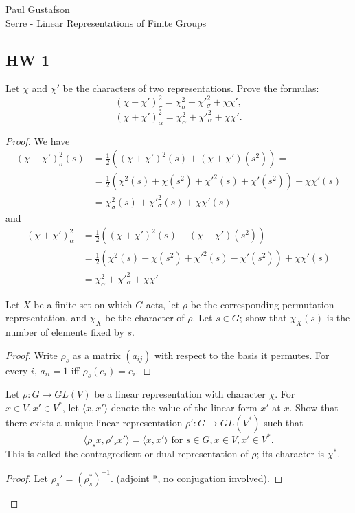 \documentclass{article}
\begin{document}
\noindent Paul Gustafson\\
\noindent Serre - Linear Representations of Finite Groups

\subsection*{HW 1}
 Let $\chi$ and $\chi'$ be the characters of two representations. Prove the formulas:
$$(\chi + \chi')_\sigma^2 = \chi_\sigma^2 + \chi'_\sigma^2 + \chi \chi',$$
$$(\chi + \chi')_\alpha^2 = \chi_\alpha^2 + \chi'_\alpha^2 + \chi \chi'.$$
\begin{proof}
We have 
\begin{align*}
(\chi + \chi')_\sigma^2(s) & = \frac 1 2 ((\chi + \chi')^2(s) + (\chi+ \chi')(s^2))= 
\\ & = \frac 1 2 (\chi^2(s) + \chi(s^2) + \chi'^2(s) + \chi'(s^2)) + \chi\chi'(s)
\\ & = \chi_\sigma^2(s) + \chi'_\sigma^2(s) + \chi \chi'(s)
\end{align*}
and
\begin{align*}
(\chi + \chi')_\alpha^2  & = \frac 1 2 ((\chi + \chi')^2(s) - (\chi+ \chi')(s^2))
\\ & = \frac 1 2 (\chi^2(s) - \chi(s^2) + \chi'^2(s) - \chi'(s^2)) + \chi\chi'(s)
\\ & = \chi_\alpha^2 + \chi'_\alpha^2 + \chi \chi'
\end{align*}

 Let $X$ be a finite set on which $G$ acts, let $\rho$ be the corresponding permutation representation, 
and $\chi_X$ be the character of $\rho$. Let $s \in G$; show that $\chi_X(s)$ is the number of elements
fixed by $s$.
\begin{proof}
Write $\rho_s$ as a matrix $(a_{ij})$ with respect to the basis it permutes.  For every $i$, $a_{ii} = 1$ iff $\rho_s(e_i) = e_i$.
\end{proof}

 Let $\rho: G \to GL(V)$ be a linear representation with character $\chi$. For $x \in V, x' \in V^*$, let $\langle x, x' \rangle$ 
denote the value of the linear form $x'$ at $x$. Show that there exists a unique linear representation $\rho': G \to GL(V^*)$
such that 
$$\langle \rho_s x, \rho'_s x' \rangle = \langle x, x' \rangle \text{ for }s \in G, x \in V, x' \in V^*.$$
This is called the contragredient or dual representation of $\rho$; its character is $\chi^*$.

\begin{proof}
Let $\rho_s' = (\rho_s^*)^{-1}$. (adjoint *, no conjugation involved).
\end{proof}





\end{proof}
\end{document}
